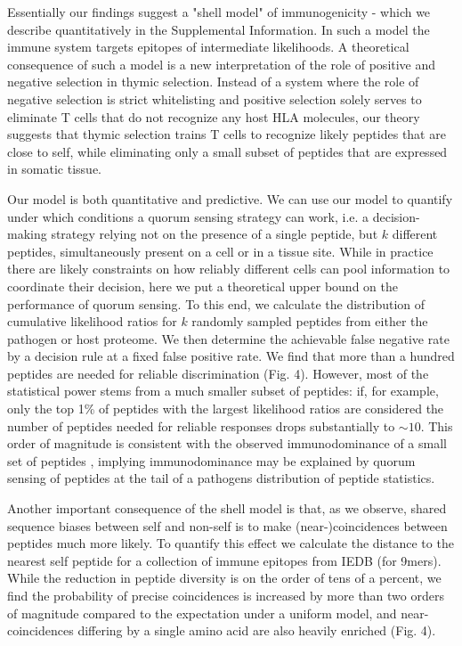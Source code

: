 \documentclass[superscriptaddress,twocolumn,pre]{revtex4}
\newcommand{\<}{\langle}
\renewcommand{\>}{\rangle}
\begin{document}
Essentially our findings suggest a "shell model" of immunogenicity - which we describe quantitatively in the Supplemental Information. In such a model the immune system targets epitopes of intermediate likelihoods. A theoretical consequence of such a model is a new interpretation of the role of positive and negative selection in thymic selection. Instead of a system where the role of negative selection is strict whitelisting and positive selection solely serves to eliminate T cells that do not recognize any host HLA molecules, our theory suggests that thymic selection trains T cells to recognize likely peptides that are close to self, while eliminating only a small subset of peptides that are expressed in somatic tissue. 

Our model is both quantitative and predictive. We can use our model to quantify under which conditions a quorum sensing strategy can work, i.e. a decision-making strategy relying not on the presence of a single peptide, but $k$ different peptides, simultaneously present on a cell or in a tissue site. While in practice there are likely constraints on how reliably different cells can pool information to coordinate their decision, here we put a theoretical upper bound on the performance of quorum sensing. To this end, we calculate the distribution of cumulative likelihood ratios for $k$ randomly sampled peptides from either the pathogen or host proteome. We then determine the achievable false negative rate by a decision rule at a fixed false positive rate. We find that more than a hundred peptides are needed for reliable discrimination (Fig. 4). However, most of the statistical power stems from a much smaller subset of peptides: if, for example, only the top 1\% of peptides with the largest likelihood ratios are considered the number of peptides needed for reliable responses drops substantially to $\sim 10$. This order of magnitude is consistent with the observed immunodominance of a small set of peptides \cite{REF NEEDED}, implying immunodominance may be explained by quorum sensing of peptides at the tail of a pathogens distribution of peptide statistics.

Another important consequence of the shell model is that, as we observe, shared sequence biases between self and non-self is to make (near-)coincidences between peptides much more likely. To quantify this effect we calculate the distance to the nearest self peptide for a collection of immune epitopes from IEDB (for 9mers). While the reduction in peptide diversity is on the order of tens of a percent, we find the probability of precise coincidences is increased by more than two orders of magnitude compared to the expectation under a uniform model, and near-coincidences differing by a single amino acid are also heavily enriched (Fig. 4).
\end{document}
